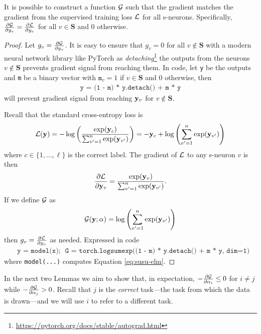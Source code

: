 \documentclass{article}
\begin{document}
\begin{lemma} \label{lemma:constructg}
It is possible to construct a function $\mathcal{G}$ such that the gradient matches the gradient from the supervised training loss $\mathcal{L}$ for all s-neurons.  Specifically, $\frac{\partial \mathcal{G}}{\partial y_v} =  \frac{\partial \mathcal{L}}{\partial y_v}$ for all $v \in \mathbf{S}$ and 0 otherwise. 
\begin{proof}
Let $g_v = \frac{\partial \mathcal{G}}{\partial y_v}$. It is easy to ensure that $g_v = 0$ for all $v \not\in \mathbf{S}$ with a modern neural network library like PyTorch \cite{paszke2019pytorch} as \emph{detaching}\footnote{\url{https://pytorch.org/docs/stable/autograd.html}} the outputs from the neurons $v \not\in \mathbf{S}$ prevents gradient signal from reaching them. In code, let \texttt{y} be the outputs and \texttt{m} be a binary vector with $\texttt{m}_v = 1$ if $v \in \mathbf{S}$ and 0 otherwise, then
\begin{align}
    \texttt{y = (1 - m) * y.detach() + m * y}
\end{align}
will prevent gradient signal from reaching $\mathbf{y}_v$ for $v \not\in \mathbf{S}$.

Recall that the standard cross-entropy loss is
\begin{align}
    \mathcal{L}(\mathbf{y}) = -\log \left( \frac{\exp(\mathbf{y}_c)}{\sum_{v' = 1}^n \exp(\mathbf{y}_{v'})} \right)
    = - \mathbf{y}_c + \log\left( \sum_{v' = 1}^n \exp(\mathbf{y}_{v'}) \right)
\end{align}
where $c \in \{1,...,\ell\}$ is the correct label. The gradient of $\mathcal{L}$ to any s-neuron $v$ is then
\begin{align}
    \frac{\partial \mathcal{L}}{\partial \mathbf{y}_v} = \frac{\exp(\mathbf{y}_v)}{\sum_{v' = 1}^n \exp(\mathbf{y}_{v'})}.
\end{align}
If we define $\mathcal{G}$ as 
\begin{align}
    \mathcal{G}(\mathbf{y}; \alpha) = \log\left( \sum_{v' = 1}^n \exp(\mathbf{y}_{v'}) \right)
\end{align}
then $g_v =  \frac{\partial \mathcal{L}}{\partial y_v}$ as needed. Expressed in code
\begin{align}
    &\texttt{y = model(x)}; \ \ \ \texttt{G = torch.logsumexp((1 - m) * y.detach() + m * y, dim=1)}
\end{align}
where \texttt{model(...)} computes Equation \ref{eq:susu-elm}.
\end{proof}
\end{lemma}
In the next two Lemmas we aim to show that, in expectation, $-\frac{\partial \mathcal{G}}{\partial \alpha_i} \leq 0$ for $i \neq j$ while $-\frac{\partial \mathcal{G}}{\partial \alpha_j} > 0$. Recall that $j$ is the \textit{correct} task---the task from which the data is drawn---and we will use $i$ to refer to a different task.
\end{document}
